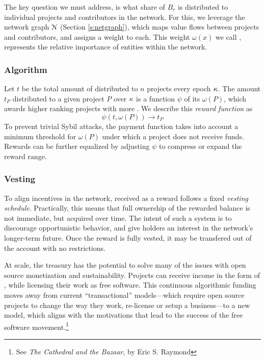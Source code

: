 The key question we must address, is what share of $B_r$ is distributed to
individual projects and contributors in the network.
For this, we leverage the \oscoin{} network graph $\mathcal{N}$ (Section
\ref{s:netgraph}), which maps value flows between projects and contributors,
and assigns a weight to each. This weight $\omega(x)$ we call \osrank{}, represents
the relative importance of entities within the network.

\subsubsection{Algorithm} Let $t$ be the total amount of \oscoin{} distributed
to $n$ projects every epoch $\kappa$. The amount $t_P$ distributed to a given
project $P$ over $\kappa$ is a function $\psi$ of its \osrank{} $\omega(P)$,
which awards higher ranking projects with more \oscoin{}. We describe this
\emph{reward function} as
\[
    \psi(t, \omega(P)) \to t_P
\]
To prevent trivial Sybil attacks, the payment function takes
into account a minimum threshold for $\omega(P)$ under which a project does not
receive funds. Rewards can be further equalized by adjusting $\psi$ to
compress or expand the reward range.

\subsubsection{Vesting} To align incentives in the network, \oscoin{} received
as a reward follows a fixed \emph{vesting schedule}. Practically, this means
that full ownership of the rewarded balance is not immediate, but acquired over time. The
intent of such a system is to discourage opportunistic behavior, and give \oscoin{}
holders an interest in the network's longer-term future. Once the reward is
fully vested, it may be transfered out of the account with no restrictions.

\bigskip

\noindent At scale, the \oscoin{} treasury has the potential to solve many of
the issues with open source monetization and sustainability. Projects can
receive income in the form of \oscoin{}, while licensing their work as free
software. This continuous algorithmic funding moves
away from current ``transactional'' models---which require open source projects
to change the way they work, re-license or setup a business---to a new model,
which aligns with the motivations that lead to the success of the free software
movement.\footnote{See \emph{The Cathedral and the Bazaar}, by Eric S. Raymond}


